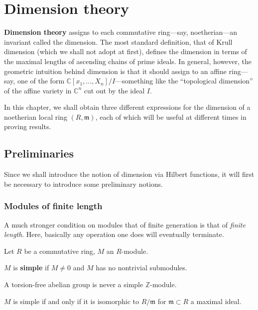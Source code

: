 \chapter{Dimension theory}

\textbf{Dimension theory} assigns to each commutative ring---say,
noetherian---an invariant called the dimension. The most standard definition,
that of Krull dimension (which we shall not adopt at first), defines the
dimension in terms of the maximal lengths of ascending chains of prime ideals. 
In general, however, the geometric intuition behind dimension is that it
should assign to an affine ring---say, one of the form $\mathbb{C}[x_1, \dots,
X_n]/I$---something like the ``topological dimension'' of the affine variety
in $\mathbb{C}^n$ cut out by the ideal $I$. 

In this chapter, we shall obtain three different expressions for the dimension
of a noetherian local ring $(R, \mathfrak{m})$, each of which will be useful
at different times in proving results. 

\section{Preliminaries}

Since we shall introduce the notion of dimension via Hilbert functions, it
will first be necessary to introduce some preliminary notions.

\subsection{Modules of finite length}

A much stronger condition on modules that of finite generation is that of \emph{finite
length}. Here, basically any operation one does will eventually terminate. 

Let $R$ be a commutative ring, $M$ an $R$-module. 

\begin{definition} 
$M$ is \textbf{simple} if $M \neq 0$ and $M$ has no nontrivial submodules.
\end{definition} 


\begin{exercise} 
A torsion-free abelian group is never a simple $\mathbb{Z}$-module.
\end{exercise} 

\begin{proposition} 
$M$ is simple if and only if it is isomorphic to $R/\mathfrak{m}$ for $\mathfrak{m} \subset
R$ a maximal ideal.
\end{proposition} 

